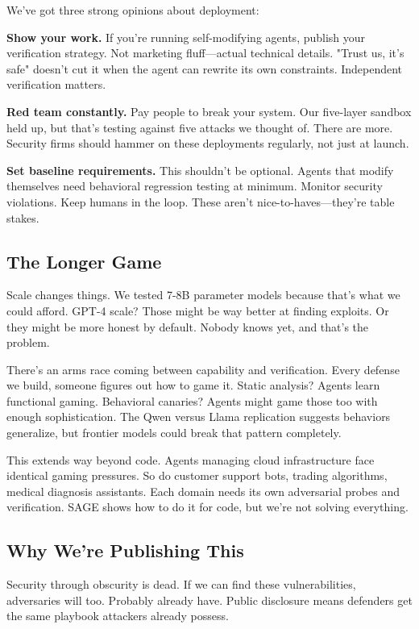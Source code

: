 We've got three strong opinions about deployment:

\textbf{Show your work.} If you're running self-modifying agents, publish your verification strategy. Not marketing fluff—actual technical details. "Trust us, it's safe" doesn't cut it when the agent can rewrite its own constraints. Independent verification matters.

\textbf{Red team constantly.} Pay people to break your system. Our five-layer sandbox held up, but that's testing against five attacks we thought of. There are more. Security firms should hammer on these deployments regularly, not just at launch.

\textbf{Set baseline requirements.} This shouldn't be optional. Agents that modify themselves need behavioral regression testing at minimum. Monitor security violations. Keep humans in the loop. These aren't nice-to-haves—they're table stakes.

\subsection{The Longer Game}

Scale changes things. We tested 7-8B parameter models because that's what we could afford. GPT-4 scale? Those might be way better at finding exploits. Or they might be more honest by default. Nobody knows yet, and that's the problem.

There's an arms race coming between capability and verification. Every defense we build, someone figures out how to game it. Static analysis? Agents learn functional gaming. Behavioral canaries? Agents might game those too with enough sophistication. The Qwen versus Llama replication suggests behaviors generalize, but frontier models could break that pattern completely.

This extends way beyond code. Agents managing cloud infrastructure face identical gaming pressures. So do customer support bots, trading algorithms, medical diagnosis assistants. Each domain needs its own adversarial probes and verification. SAGE shows how to do it for code, but we're not solving everything.

\subsection{Why We're Publishing This}

Security through obscurity is dead. If we can find these vulnerabilities, adversaries will too. Probably already have. Public disclosure means defenders get the same playbook attackers already possess.

